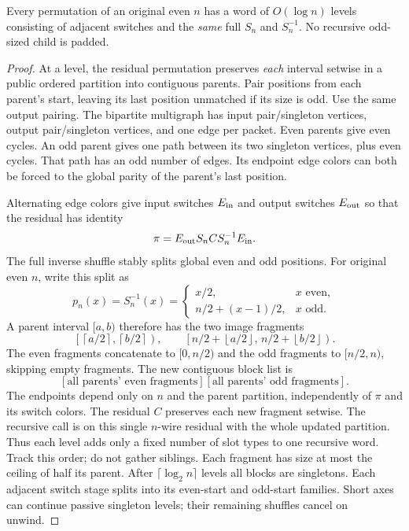 \begin{lemma}
\label{lem:ragged}
Every permutation of an original even $n$ has a word of $O(\log n)$
levels consisting of adjacent switches and the \emph{same} full $S_n$
and $S_n^{-1}$. No recursive odd-sized child is padded.
\end{lemma}
\begin{proof}
At a level, the residual permutation preserves \emph{each} interval
setwise in a public ordered partition into contiguous parents.
Pair positions from each parent's
start, leaving its last position unmatched if its size is odd.
Use the same output pairing. The bipartite multigraph has input
pair/singleton vertices, output pair/singleton vertices, and one edge
per packet. Even parents give even cycles. An odd parent gives one
path between its two singleton vertices, plus even cycles. That path
has an odd number of edges. Its endpoint edge colors can both be
forced to the global parity of the parent's last position.

Alternating edge colors give input switches $E_{\rm in}$ and output
switches $E_{\rm out}$ so that the residual has identity
\[
 \pi=E_{\rm out}S_n C S_n^{-1}E_{\rm in}.
\]
The full inverse shuffle stably splits global even and odd positions.
For original even $n$, write this split as
\[
 p_n(x)=S_n^{-1}(x)=
 \begin{cases}
 x/2,&x\text{ even},\\
 n/2+(x-1)/2,&x\text{ odd}.
 \end{cases}
\]
A parent interval $[a,b)$ therefore has the two image fragments
\[
 \left[\left\lceil a/2\right\rceil,\left\lceil b/2\right\rceil\right),
 \qquad
 \left[n/2+\left\lfloor a/2\right\rfloor,\,
       n/2+\left\lfloor b/2\right\rfloor\right).
\]
The even fragments concatenate to $[0,n/2)$ and the odd fragments
to $[n/2,n)$, skipping empty fragments.
The new contiguous block list is
\[
 [\text{all parents' even fragments}]
 [\text{all parents' odd fragments}].
\]
The endpoints depend only on $n$ and the parent partition, independently
of $\pi$ and its switch colors. The residual $C$ preserves each new
fragment setwise. The recursive call is on this single $n$-wire
residual with the whole updated partition. Thus each level adds only
a fixed number of slot types to one recursive word.
Track this order; do not gather siblings. Each fragment has size at most
the ceiling of half its parent. After $\lceil\log_2n\rceil$ levels all
blocks are singletons. Each adjacent switch stage splits into its
even-start and odd-start families. Short axes can continue passive
singleton levels; their remaining shuffles cancel on unwind.
\end{proof}

